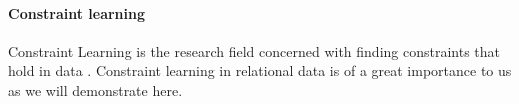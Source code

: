 %       



\paragraph{Constraint learning} \label{sec:constraint_learning}
Constraint Learning is the research field concerned with finding 
constraints that hold in data
\parencite{constraint_learning,QUACQ,Conacq}. Constraint learning in
relational data is of a great importance to us as we will demonstrate
here.


